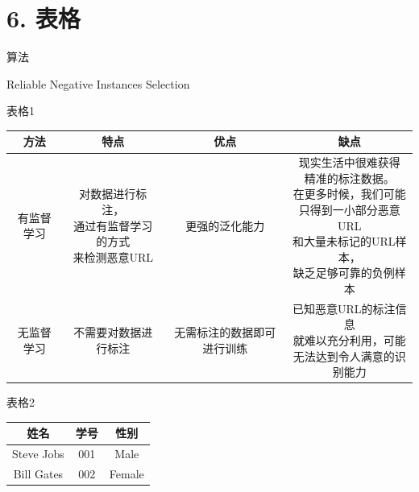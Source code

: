 \documentclass{article}
\begin{document}
\section{6. 表格} 
算法
\begin{algorithm}[H]
	\begin{algorithmic}[1] %
		
		\EndIf
		\EndFor
	\end{algorithmic}
	\caption{Reliable Negative Instances Selection}
	\label{alg:Reliable Negative Instances Selection}
\end{algorithm}

表格1 

\begin{tabular}{|c|c|c|c|}
	\hline 
	方法 & 特点 & 优点 & 缺点  \\ 
	\hline 
	有监督学习 & \tabincell{c}{对数据进行标注，\\ 通过有监督学习的方式\\ 来检测恶意URL} & 更强的泛化能力 & \tabincell{l}{现实生活中很难获得\\ 精准的标注数据。\\ 在更多时候，我们可能\\ 只得到一小部分恶意URL\\ 和大量未标记的URL样本，\\ 缺乏足够可靠的负例样本} \\ 
	\hline 
	无监督学习 & 不需要对数据进行标注 & 无需标注的数据即可进行训练 & \tabincell{c}{已知恶意URL的标注信息\\ 就难以充分利用，可能\\ 无法达到令人满意的识别能力} \\
	\hline
\end{tabular}  

表格2

\begin{tabular}{ccc}
	\hline
	姓名& 学号& 性别\\
	\hline
	Steve Jobs& 001& Male\\
	Bill Gates& 002& Female\\
	\hline
\end{tabular}
\end{document}
